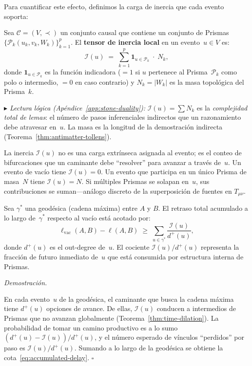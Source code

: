 \documentclass[11pt, a4paper, openany]{book}
\newcommand{\stoneref}[1]{%
  \smallskip\noindent
  {\small\color{structure!70}\textit{$\blacktriangleright$ Lectura
  l\'ogica (Ap\'endice~\ref{app:stone-duality}):} #1}%
  \smallskip}
\renewenvironment{proof}[1][Demostraci\'on]{%
  \par\noindent\textit{#1.}\quad
}{\hfill$\square$\par\medskip}
\begin{document}
Para cuantificar este efecto, definimos la carga de inercia que cada
evento soporta:

\begin{definition}
\label{def:inertia-tensor}
Sea $\mathcal{C} = (V, \prec)$ un conjunto causal que contiene un
conjunto de Prismas
$\{\mathcal{P}_k(u_k, v_k, W_k)\}_{k=1}^{p}$. El \textbf{tensor de
inercia local} en un evento~$u \in V$ es:
\begin{equation}
  \mathcal{I}(u)
  \;=\;
  \sum_{k=1}^{p} \mathbf{1}_{u \in \mathcal{P}_k} \;\cdot\; N_k,
  \label{eq:inertia-tensor}
\end{equation}
donde $\mathbf{1}_{u \in \mathcal{P}_k}$ es la funci\'on indicadora
($= 1$ si $u$ pertenece al Prisma~$\mathcal{P}_k$ como polo o
intermedio, $= 0$ en caso contrario) y $N_k = |W_k|$ es la masa
topol\'ogica del Prisma~$k$.
\end{definition}

\stoneref{$\mathcal{I}(u) = \sum N_k$ es la \emph{complejidad total
de lemas}: el n\'umero de pasos inferenciales indirectos que un
razonamiento debe atravesar en~$u$. La masa es la longitud de la
demostraci\'on indirecta
(Teorema~\ref{thm:antimatter-tollens}).}

\noindent
La inercia $\mathcal{I}(u)$ no es una carga extr\'inseca asignada al
evento; es el conteo de bifurcaciones que un caminante debe
``resolver'' para avanzar a trav\'es de~$u$. Un evento de vac\'io
tiene $\mathcal{I}(u) = 0$. Un evento que participa en un \'unico
Prisma de masa~$N$ tiene $\mathcal{I}(u) = N$. Si m\'ultiples Prismas
se solapan en~$u$, sus contribuciones se suman---an\'alogo discreto
de la superposici\'on de fuentes en $T_{\mu\nu}$.

\begin{theorem}
\label{thm:accumulated-delay}
Sea $\gamma^*$ una geod\'esica (cadena m\'axima) entre $A$ y $B$. El
retraso total acumulado a lo largo de~$\gamma^*$ respecto al vac\'io
est\'a acotado por:
\begin{equation}
  \ell_{\text{vac}}(A,B) - \ell(A,B)
  \;\geq\;
  \sum_{u \in \gamma^*} \frac{\mathcal{I}(u)}{d^+(u)},
  \label{eq:accumulated-delay}
\end{equation}
donde $d^+(u)$ es el out-degree de~$u$. El cociente
$\mathcal{I}(u)/d^+(u)$ representa la fracci\'on de futuro inmediato
de~$u$ que est\'a consumida por estructura interna de Prismas.
\end{theorem}

\begin{proof}
En cada evento~$u$ de la geod\'esica, el caminante que busca la cadena
m\'axima tiene $d^+(u)$ opciones de avance. De ellas,
$\mathcal{I}(u)$ conducen a intermedios de Prismas que no avanzan
globalmente (Teorema~\ref{thm:time-dilation}). La probabilidad de
tomar un camino productivo es a lo sumo
$(d^+(u) - \mathcal{I}(u))/d^+(u)$, y el n\'umero esperado de
v\'inculos ``perdidos'' por paso es $\mathcal{I}(u)/d^+(u)$.
Sumando a lo largo de la geod\'esica se obtiene la
cota~\eqref{eq:accumulated-delay}.
\end{proof}
\end{document}
